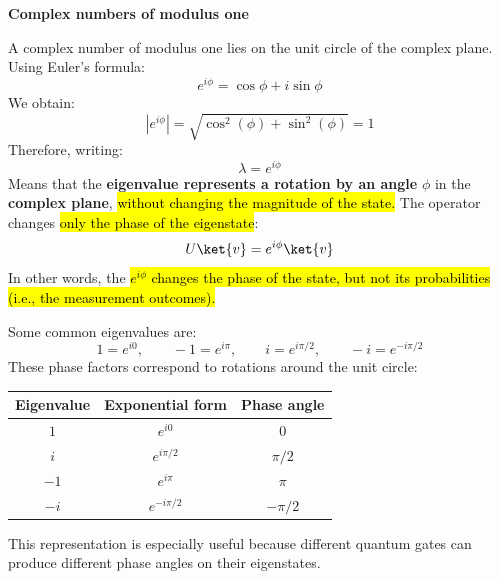 \newpage

\begin{flushleft}
    \textcolor{Green3}{ \textbf{Complex numbers of modulus one}}
\end{flushleft}
A complex number of modulus one lies on the unit circle of the complex plane. Using Euler's formula:
\begin{equation*}
    e^{i\phi}=\cos\phi+i\sin\phi
\end{equation*}
We obtain:
\begin{equation*}
    \left|e^{i\phi}\right|
    =
    \sqrt{\cos^2(\phi)+\sin^2(\phi)}
    =
    1
\end{equation*}
Therefore, writing:
\begin{equation*}
    \lambda=e^{i\phi}
\end{equation*}
Means that the \textbf{eigenvalue represents a rotation by an angle} $\phi$ in the \textbf{complex plane}, \hl{without changing the magnitude of the state.} The operator changes \hl{only the phase of the eigenstate}:
\begin{equation*}
    U\ket{v}=e^{i\phi}\ket{v}
\end{equation*}
In other words, the \hl{$e^{i\phi}$ changes the phase of the state, but not its probabilities (i.e., the measurement outcomes).}

\highspace
\begin{examplebox}
    Some common eigenvalues are:
    \begin{equation*}
        1=e^{i0},
        \qquad
        -1=e^{i\pi},
        \qquad
        i=e^{i\pi/2},
        \qquad
        -i=e^{-i\pi/2}
    \end{equation*}
    These phase factors correspond to rotations around the unit circle:
    \begin{center}
        \begin{tabular}{@{} c c c @{}}
            \toprule
            Eigenvalue & Exponential form & Phase angle \\
            \midrule
            $1$ & $e^{i0}$ & $0$ \\
            $i$ & $e^{i\pi/2}$ & $\pi/2$ \\
            $-1$ & $e^{i\pi}$ & $\pi$ \\
            $-i$ & $e^{-i\pi/2}$ & $-\pi/2$ \\
            \bottomrule
        \end{tabular}
    \end{center}
    This representation is especially useful because different quantum gates can produce different phase angles on their eigenstates.
\end{examplebox}

